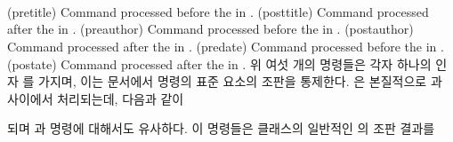 \begin{syntax}
\cmd{\pretitle} \cmd{\posttitle} \\
\cmd{\preauthor} \cmd{\postauthor} \\
\cmd{\predate} \cmd{\postdate} \\
\end{syntax}
\glossary(pretitle)%
  {}%
  {Command processed before the  in .} 
\glossary(posttitle)%
  {}%
  {Command processed after the  in .} 
\glossary(preauthor)%
  {}%
  {Command processed before the  in .} 
\glossary(postauthor)%
  {}%
  {Command processed after the  in .} 
\glossary(predate)%
  {}%
  {Command processed before the  in .} 
\glossary(postate)%
  {}%
  {Command processed after the  in .} 
위 여섯 개의 명령들은 각자 하나의 인자 를 가지며, 이는 문서에서
\cmd{\maketitle} 명령의 표준 요소의 조판을 통제한다.
\cmd{\title}은 본질적으로 \cmd{\pretitle}과 \cmd{\posttitle} 사이에서
처리되는데, 다음과 같이
\begin{lcode}
{\pretitle \title \posttitle}
\end{lcode}
되며 \cmd{\author}과 \cmd{\date} 명령에 대해서도 유사하다.
이 명령들은  클래스의 일반적인 \cmd{\maketitle}의 조판 결과를
